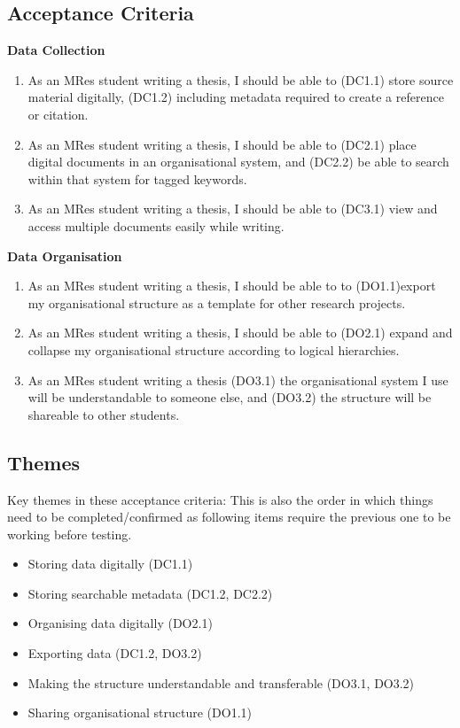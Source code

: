 \documentclass{article}
\begin{document}
\subsection{Acceptance Criteria}
\textbf{Data Collection}
\begin{enumerate}
    \item As an MRes student writing a thesis, I should be able to (DC1.1) store source material digitally, (DC1.2) including metadata required to create a reference or citation.
    \item As an  MRes student writing a thesis, I should be able to (DC2.1) place digital documents in an organisational system, and (DC2.2) be able to search within that system for tagged keywords. 
    \item As an MRes student writing a thesis, I should be able to (DC3.1) view and access multiple documents easily while writing.
\end{enumerate}
    


\noindent \textbf{Data Organisation}
\begin{enumerate}
    \item As an MRes student writing a thesis, I should be able to to (DO1.1)export my organisational structure as a template for other research projects. 
    \item As an MRes student writing a thesis, I should be able to (DO2.1) expand and collapse my organisational structure according to logical hierarchies.
    \item As an MRes student writing a thesis (DO3.1) the organisational system I use will be understandable to someone else, and (DO3.2) the structure will be shareable to other students.
\end{enumerate}

\subsection{Themes} 

Key themes in these acceptance criteria:
This is also the order in which things need to be completed/confirmed as following items require the previous one to be working before testing.

\begin{itemize}
    \item Storing data digitally (DC1.1)
    \item Storing searchable metadata (DC1.2, DC2.2)
    \item Organising data digitally (DO2.1)
    \item Exporting data (DC1.2, DO3.2)
    \item Making the structure understandable and transferable (DO3.1, DO3.2)
    \item Sharing organisational structure (DO1.1)
\end{itemize}
\end{document}
